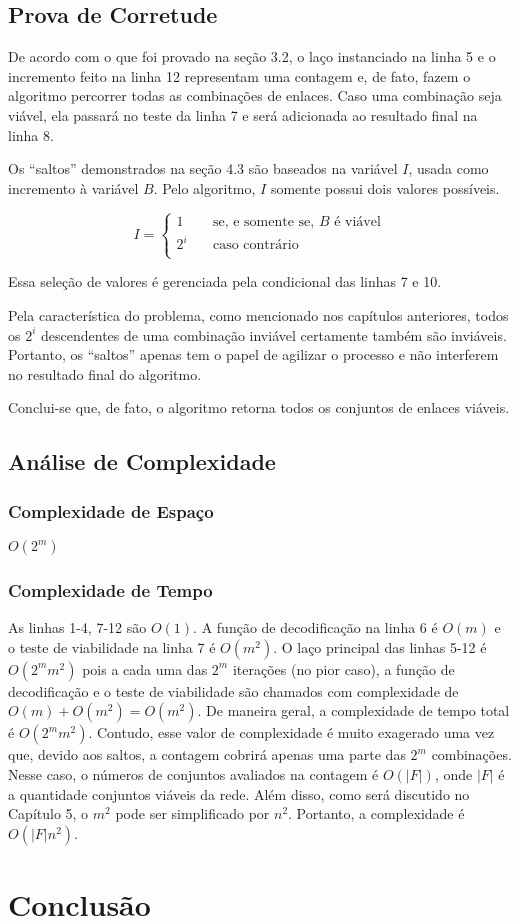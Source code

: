 \subsection{Prova de Corretude}

	De acordo com o que foi provado na seção 3.2, o laço instanciado na linha 5 e o incremento feito na linha 12 representam uma contagem e, de fato, fazem o algoritmo percorrer todas as combinações de enlaces. Caso uma combinação seja viável, ela passará no teste da linha 7 e será adicionada ao resultado final na linha 8.

Os “saltos” demonstrados na seção 4.3 são baseados na variável $I$, usada como incremento à variável $B$. Pelo algoritmo, $I$ somente possui dois valores possíveis. 

\[ I =
\begin{cases}
	1	& \quad	\text{se, e somente se, } B \text{ é viável} \\
	2^i	& \quad	\text{caso contrário} \\
  \end{cases}
\]

Essa seleção de valores é gerenciada pela condicional das linhas 7 e 10.

Pela característica do problema, como mencionado nos capítulos anteriores, todos os $2^i$ descendentes de uma combinação inviável certamente também são inviáveis. Portanto, os “saltos” apenas tem o papel de agilizar o processo e não interferem no resultado final do algoritmo.

Conclui-se que, de fato, o algoritmo retorna todos os conjuntos de enlaces viáveis.

\subsection{Análise de Complexidade}

\subsubsection{Complexidade de Espaço}

$O(2^m)$

\subsubsection{Complexidade de Tempo}

	As linhas 1-4, 7-12 são $O(1)$. A função de decodificação na linha 6 é $O(m)$ e o teste de viabilidade na linha 7 é $O(m^2)$. O laço principal das linhas 5-12 é $O(2^mm^2)$ pois a cada uma das $2^m$ iterações (no pior caso), a função de decodificação e o teste de viabilidade são chamados com complexidade de $O(m) + O(m^2) = O(m^2)$. De maneira geral, a complexidade de tempo total é  $O(2^mm^2)$. 
Contudo, esse valor de complexidade é muito exagerado uma vez que, devido aos saltos, a contagem cobrirá apenas uma parte das $2^m$ combinações. Nesse caso, o números de conjuntos avaliados na contagem é $O(|F|)$, onde $|F|$ é a quantidade conjuntos viáveis da rede. Além disso, como será discutido no Capítulo 5, o $m^2$ pode ser simplificado por $n^2$. Portanto, a complexidade é $O(|F|n^2)$.

\section{Conclusão}
